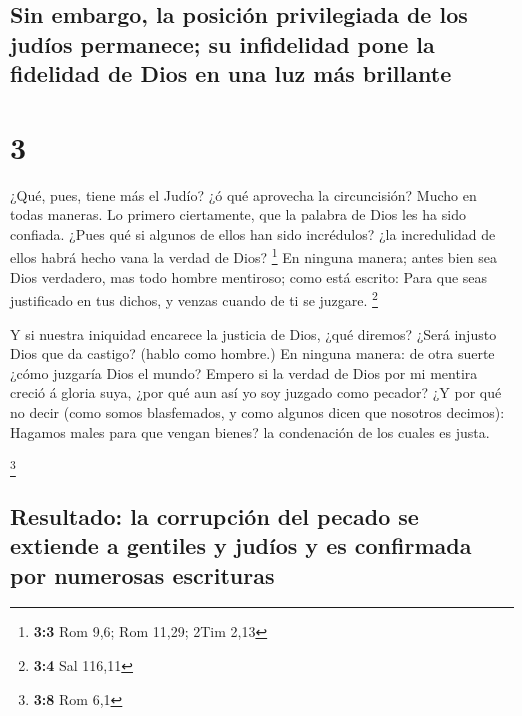 \hypertarget{sin-embargo-la-posiciuxf3n-privilegiada-de-los-juduxedos-permanece-su-infidelidad-pone-la-fidelidad-de-dios-en-una-luz-muxe1s-brillante}{%
\subsection{Sin embargo, la posición privilegiada de los judíos
permanece; su infidelidad pone la fidelidad de Dios en una luz más
brillante}\label{sin-embargo-la-posiciuxf3n-privilegiada-de-los-juduxedos-permanece-su-infidelidad-pone-la-fidelidad-de-dios-en-una-luz-muxe1s-brillante}}

\hypertarget{section-2}{%
\section{3}\label{section-2}}

 ¿Qué, pues, tiene más el Judío? ¿ó qué aprovecha la
circuncisión?  Mucho en todas maneras. Lo primero
ciertamente, que la palabra de Dios les ha sido confiada. 
¿Pues qué si algunos de ellos han sido incrédulos? ¿la incredulidad de
ellos habrá hecho vana la verdad de Dios? \footnote{\textbf{3:3} Rom
  9,6; Rom 11,29; 2Tim 2,13}  En ninguna manera; antes bien
sea Dios verdadero, mas todo hombre mentiroso; como está escrito: Para
que seas justificado en tus dichos, y venzas cuando de ti se juzgare.
\footnote{\textbf{3:4} Sal 116,11}

 Y si nuestra iniquidad encarece la justicia de Dios, ¿qué
diremos? ¿Será injusto Dios que da castigo? (hablo como hombre.)
 En ninguna manera: de otra suerte ¿cómo juzgaría Dios el
mundo?  Empero si la verdad de Dios por mi mentira creció á
gloria suya, ¿por qué aun así yo soy juzgado como pecador? 
¿Y por qué no decir (como somos blasfemados, y como algunos dicen que
nosotros decimos): Hagamos males para que vengan bienes? la condenación
de los cuales es justa.

\footnote{\textbf{3:8} Rom 6,1}

\hypertarget{resultado-la-corrupciuxf3n-del-pecado-se-extiende-a-gentiles-y-juduxedos-y-es-confirmada-por-numerosas-escrituras}{%
\subsection{Resultado: la corrupción del pecado se extiende a gentiles y
judíos y es confirmada por numerosas
escrituras}\label{resultado-la-corrupciuxf3n-del-pecado-se-extiende-a-gentiles-y-juduxedos-y-es-confirmada-por-numerosas-escrituras}}

